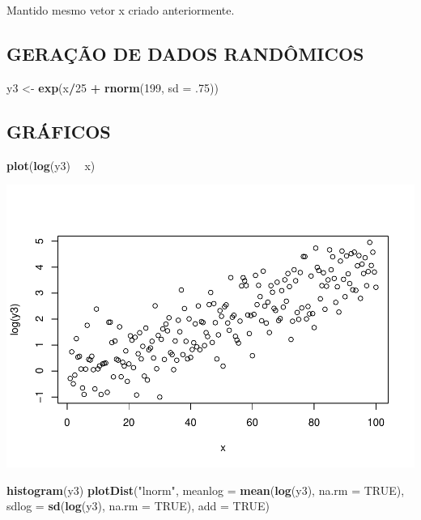 \documentclass[]{article}
\newenvironment{Shaded}{\begin{snugshade}}{\end{snugshade}}
\newcommand{\KeywordTok}[1]{\textcolor[rgb]{0.13,0.29,0.53}{\textbf{#1}}}
\newcommand{\DataTypeTok}[1]{\textcolor[rgb]{0.13,0.29,0.53}{#1}}
\newcommand{\DecValTok}[1]{\textcolor[rgb]{0.00,0.00,0.81}{#1}}
\newcommand{\StringTok}[1]{\textcolor[rgb]{0.31,0.60,0.02}{#1}}
\newcommand{\OtherTok}[1]{\textcolor[rgb]{0.56,0.35,0.01}{#1}}
\newcommand{\OperatorTok}[1]{\textcolor[rgb]{0.81,0.36,0.00}{\textbf{#1}}}
\newcommand{\NormalTok}[1]{#1}
\begin{document}
Mantido mesmo vetor x criado anteriormente.

\subsection{GERAÇÃO DE DADOS
RANDÔMICOS}\label{geracao-de-dados-randomicos-3}

\begin{Shaded}
\begin{Highlighting}[]
\NormalTok{y3 <-}\StringTok{ }\KeywordTok{exp}\NormalTok{(x}\OperatorTok{/}\DecValTok{25} \OperatorTok{+}\StringTok{ }\KeywordTok{rnorm}\NormalTok{(}\DecValTok{199}\NormalTok{, }\DataTypeTok{sd =}\NormalTok{ .}\DecValTok{75}\NormalTok{)) }
\end{Highlighting}
\end{Shaded}

\subsection{GRÁFICOS}\label{graficos-3}

\begin{Shaded}
\begin{Highlighting}[]
\KeywordTok{plot}\NormalTok{(}\KeywordTok{log}\NormalTok{(y3) }\OperatorTok{~}\StringTok{ }\NormalTok{x)}
\end{Highlighting}
\end{Shaded}

\includegraphics{Impacto_sigma_files/figure-latex/unnamed-chunk-15-1.pdf}

\begin{Shaded}
\begin{Highlighting}[]
\KeywordTok{histogram}\NormalTok{(y3)}
\KeywordTok{plotDist}\NormalTok{(}\StringTok{"lnorm"}\NormalTok{, }
         \DataTypeTok{meanlog =} \KeywordTok{mean}\NormalTok{(}\KeywordTok{log}\NormalTok{(y3), }\DataTypeTok{na.rm =} \OtherTok{TRUE}\NormalTok{),}
         \DataTypeTok{sdlog =} \KeywordTok{sd}\NormalTok{(}\KeywordTok{log}\NormalTok{(y3), }\DataTypeTok{na.rm =} \OtherTok{TRUE}\NormalTok{), }
         \DataTypeTok{add =} \OtherTok{TRUE}\NormalTok{)}
\end{Highlighting}
\end{Shaded}
\end{document}
